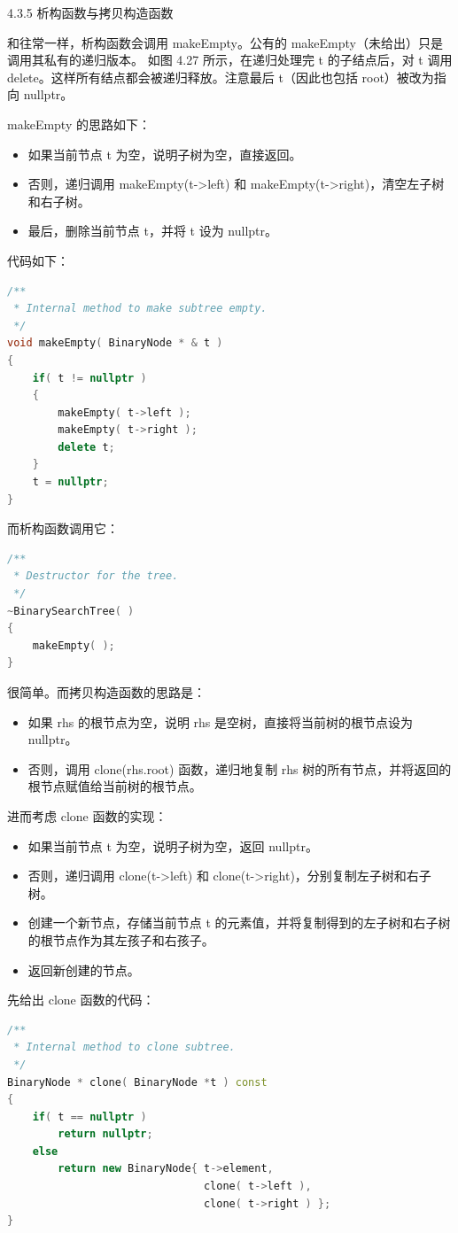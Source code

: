 \documentclass[a4paper]{ctexart}
\theoremstyle{definition}
\theoremstyle{definition}
\begin{document}
4.3.5 析构函数与拷贝构造函数

和往常一样，析构函数会调用 makeEmpty。公有的 makeEmpty（未给出）只是调用其私有的递归版本。
如图 4.27 所示，在递归处理完 t 的子结点后，对 t 调用 delete。这样所有结点都会被递归释放。注意最后 t（因此也包括 root）被改为指向 nullptr。

makeEmpty 的思路如下：
\begin{itemize}
\item 如果当前节点 t 为空，说明子树为空，直接返回。
\item 否则，递归调用 makeEmpty(t->left) 和 makeEmpty(t->right)，清空左子树和右子树。
\item 最后，删除当前节点 t，并将 t 设为 nullptr。
\end{itemize}

代码如下：
\begin{lstlisting}[language=C++]
/**
 * Internal method to make subtree empty.
 */
void makeEmpty( BinaryNode * & t )
{
    if( t != nullptr )
    {
        makeEmpty( t->left );
        makeEmpty( t->right );
        delete t;
    }
    t = nullptr;
}
\end{lstlisting}
而析构函数调用它：
\begin{lstlisting}[language=C++]
/**
 * Destructor for the tree.
 */
~BinarySearchTree( )
{
    makeEmpty( );
}
\end{lstlisting}

很简单。而拷贝构造函数的思路是：

\begin{itemize}
\item 如果 rhs 的根节点为空，说明 rhs 是空树，直接将当前树的根节点设为 nullptr。
\item 否则，调用 clone(rhs.root) 函数，递归地复制 rhs 树的所有节点，并将返回的根节点赋值给当前树的根节点。
\end{itemize}

进而考虑 clone 函数的实现：
\begin{itemize}
\item 如果当前节点 t 为空，说明子树为空，返回 nullptr。
\item 否则，递归调用 clone(t->left) 和 clone(t->right)，分别复制左子树和右子树。
\item 创建一个新节点，存储当前节点 t 的元素值，并将复制得到的左子树和右子树的根节点作为其左孩子和右孩子。
\item 返回新创建的节点。
\end{itemize}

先给出 clone 函数的代码：
\begin{lstlisting}[language=C++]
/**
 * Internal method to clone subtree.
 */
BinaryNode * clone( BinaryNode *t ) const
{
    if( t == nullptr )  
        return nullptr;
    else
        return new BinaryNode{ t->element, 
                               clone( t->left ), 
                               clone( t->right ) };
}
\end{lstlisting}
\end{document}
